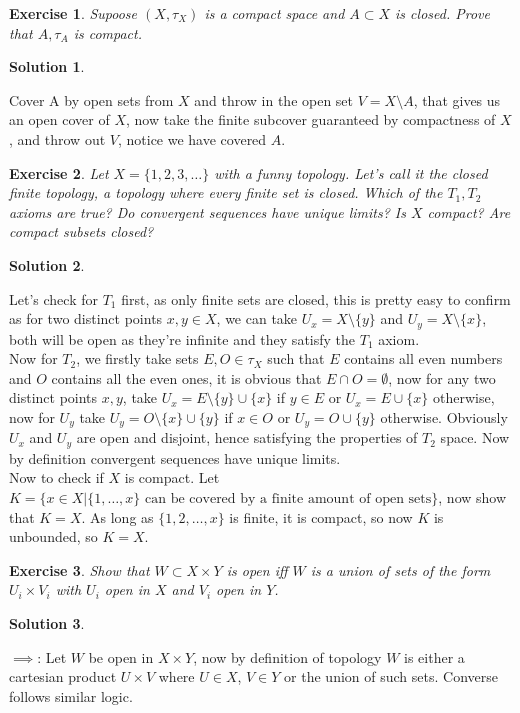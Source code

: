\documentclass[11pt,a4paper]{article}
\newtheorem{Ex}{Exercise}
\newtheorem{Sol}{Solution}
\begin{document}
\begin{Ex}
	Supoose $(X , \tau_X)$ is a compact space and $A \subset X$ is closed. Prove that $A, \tau_A$ is compact.
\end{Ex}

\begin{Sol} \end{Sol}
Cover A by open sets from $X$ and throw in the open set $V = X \setminus A$, that gives us an open cover of $X$, now take the finite subcover guaranteed by compactness of $X$, and throw out $V$, notice we have covered $A$.

\begin{Ex}
	Let $X = \{1,2,3, \dots\}$ with a funny topology. Let's call it the closed finite topology, a topology where every finite set is closed. Which of the $T_1, T_2$ axioms are true? Do convergent sequences have unique limits? Is $X$ compact? Are compact subsets closed? 
\end{Ex}
\begin{Sol}\end{Sol}
\noindent Let's check for $T_1$ first, as only finite sets are closed, this is pretty easy to confirm as for two distinct points $x,y \in X$, we can take $U_x = X \setminus \{y\}$ and $U_y = X \setminus \{x\}$, both will be open as they're infinite and they satisfy the $T_1$ axiom. \\
 Now for $T_2$, we firstly take sets $E,O \in \tau_X$ such that $E$ contains all even numbers and $O$ contains all the even ones, it is obvious that $E \cap O = \emptyset$, now for any two distinct points $x, y$, take $U_x = E \setminus \{y\} \cup \{x\}$ if $y \in E$ or $U_x = E \cup \{x\}$ otherwise, now for $U_y$ take $U_y = O \setminus \{x\} \cup \{y\}$ if $x \in O$ or $U_y = O \cup \{y\}$ otherwise. Obviously $U_x$ and $U_y$ are open and disjoint, hence satisfying the properties of $T_2$ space. Now by definition convergent sequences have unique limits. \\
  Now to check if $X$ is compact. Let $K = \{x \in X| \{1, \dots, x \} \text{ can be covered by a finite amount of open sets}\}$, now show that $K = X$. As long as $\{1,2, \dots, x\}$ is finite, it is compact, so now $K$ is unbounded, so $K = X$.
  
\begin{Ex}
	Show that $W \subset X \times Y$ is open iff $W$ is a union of sets of the form $U_i \times V_i$ with $U_i$ open in $X$ and $V_i$ open in $Y$.
\end{Ex}

\begin{Sol} \end{Sol}
\noindent $\implies$: Let $W$ be open in $X \times Y$, now by definition of topology $W$ is either a cartesian product $U \times V$ where $U \in X$, $V \in Y$ or the union of such sets. Converse follows similar logic.
\end{document}
